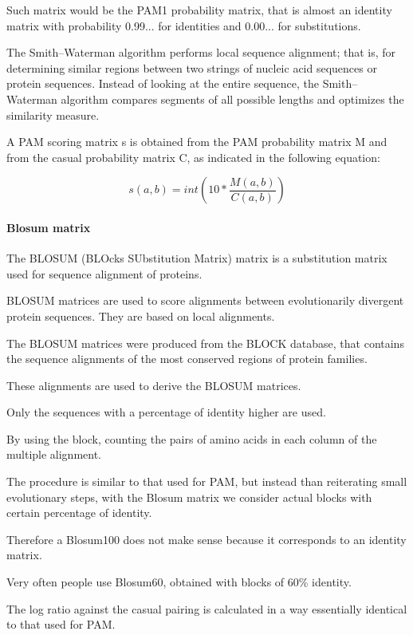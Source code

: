 Such matrix would be the PAM1 probability matrix, that is almost an identity
matrix with probability 0.99... for identities and 0.00... for substitutions.

The Smith–Waterman algorithm performs local sequence alignment; that is, for
determining similar regions between two strings of nucleic acid sequences or
protein sequences. Instead of looking at the entire sequence, the
Smith–Waterman algorithm compares segments of all possible lengths and
optimizes the similarity measure.

A PAM scoring matrix s is obtained from the PAM
probability matrix M and from the casual probability
matrix C, as indicated in the following equation:

\begin{equation}
s(a,b) = int(10*\frac{M(a,b)}{C(a,b)})
\end{equation}

\paragraph*{Blosum matrix}

The BLOSUM (BLOcks SUbstitution Matrix) matrix is a
substitution matrix used for sequence alignment of proteins.

BLOSUM matrices are used to score alignments between evolutionarily
divergent protein sequences. They are based on local alignments.

The BLOSUM matrices were produced from the BLOCK database, that contains
the sequence alignments of the most conserved regions of protein families.

These alignments are used to derive the BLOSUM matrices.

Only the sequences with a percentage of identity higher are used.

By using the block, counting the pairs of amino acids in each column of the
multiple alignment.

The procedure is similar to that used for PAM, but instead than reiterating
small evolutionary steps, with the Blosum matrix we consider actual blocks
with certain percentage of identity.

Therefore a Blosum100 does not make sense because it corresponds to an
identity matrix.

Very often people use Blosum60, obtained with blocks of 60\% identity.

The log ratio against the casual pairing is calculated in a way essentially
identical to that used for PAM.


